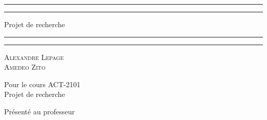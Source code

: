 	\begin{titlepage}
		\centering %
		
		\scshape %
		
		\vspace*{3\baselineskip} %
		
		
		\rule{\textwidth}{1.6pt}\vspace*{-\baselineskip}\vspace*{2pt} %
		\rule{\textwidth}{0.4pt} %
		
		\vspace{0.75\baselineskip} %
		
		{\LARGE Projet de recherche\\} %
		\vspace{0.75\baselineskip} %
		
		\rule{\textwidth}{0.4pt}\vspace*{-\baselineskip}\vspace{3.2pt} %
		\rule{\textwidth}{1.6pt} %
		
		\vspace{2\baselineskip} %
		
		{\scshape\Large Alexandre Lepage \\Amedeo Zito\\} %
		
		\vspace*{3\baselineskip}
		
		Pour le cours ACT-2101\\
		Projet de recherche \\%
		
		\vspace*{3\baselineskip} %
		
		
		Présenté au professeur
		
		\vspace{0.5\baselineskip} %
		

\end{titlepage}
